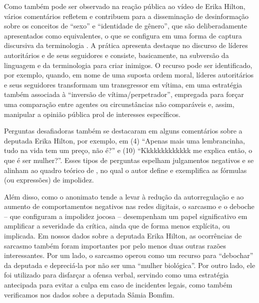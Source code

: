 \documentclass[portuguese]{textolivre}
\begin{document}
Como também pode ser observado na reação pública ao vídeo de Erika Hilton, vários comentários refletem e contribuem para a disseminação de desinformação sobre os conceitos de ``sexo'' e ``identidade de gênero'', que são deliberadamente apresentados como equivalentes, o que se configura em uma forma de captura discursiva da terminologia \cite{lewin2021}. A prática apresenta destaque no discurso de líderes autoritários e de seus seguidores e consiste, basicamente, na subversão da linguagem e da terminologia para criar inimigos. O recurso pode ser identificado, por exemplo, quando, em nome de uma suposta ordem moral, líderes autoritários e seus seguidores transformam um transgressor em vítima, em uma estratégia também associada à ``inversão de vítima/perpetrador'', empregada para forçar uma comparação entre agentes ou circunstâncias não comparáveis e, assim, manipular a opinião pública prol de interesses específicos.

Perguntas desafiadoras também se destacaram em alguns comentários sobre a deputada Erika Hilton, por exemplo, em (4) ``Apenas mais uma lembrancinha, tudo na vida tem um preço, não é?'' e (10) ``Kkkkkkkkkkkkk me explica então, o que é ser mulher?''. Esses tipos de perguntas espelham julgamentos negativos e se alinham ao quadro teórico de \textcite{culpeper2010, culpeper2011}, no qual o autor define e exemplifica as fórmulas (ou expressões) de impolidez.

Além disso, como o anonimato tende a levar à redução da autorregulação e ao aumento de comportamentos negativos nas redes digitais, o sarcasmo e o deboche – que configuram a impolidez jocosa – desempenham um papel significativo em amplificar a severidade da crítica, ainda que de forma menos explícita, ou implicada. Em nossos dados sobre a deputada Erika Hilton, as ocorrências de sarcasmo também foram importantes por pelo menos duas outras razões interessantes. Por um lado, o sarcasmo operou como um recurso para ``debochar'' da deputada e depreciá-la por não ser uma ``mulher biológica''. Por outro lado, ele foi utilizado para disfarçar a ofensa verbal, servindo como uma estratégia antecipada para evitar a culpa em caso de incidentes legais, como também verificamos nos dados sobre a deputada Sâmia Bomfim.
\end{document}
